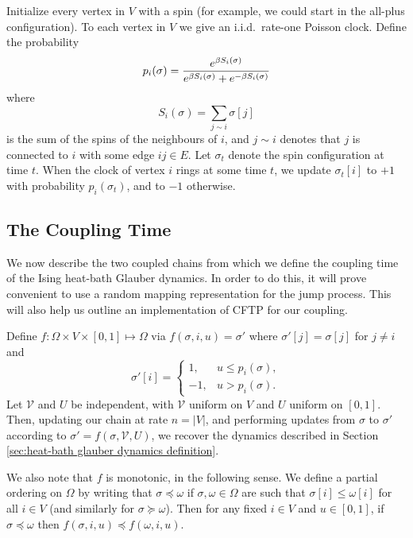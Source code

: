 	Initialize every vertex in $V$ with a spin (for example, we could start in the all-plus configuration). To each vertex in $V$ we give an i.i.d.\ rate-one Poisson clock. Define the probability 
	\begin{equation}
		p_i(\sigma) = \frac{e^{\beta S_i(\sigma)}}{e^{\beta S_i(\sigma)} + e^{-\beta S_i(\sigma)}}
		\label{eq:define p_i}
	\end{equation}
	where
	\begin{equation}
		S_i(\sigma) = \sum_{j \sim i} \sigma[j]
	\end{equation}
	is the sum of the spins of the neighbours of $i$, and $j \sim i$ denotes that $j$ is connected to $i$ with some edge $ij \in E$. Let $\sigma_t$ denote the spin configuration at time $t$. When the clock of vertex $i$ rings at some time $t$, we update $\sigma_t[i]$ to $+1$ with probability $p_i(\sigma_t)$, and to $-1$ otherwise.

	\subsection{The Coupling Time}
	\label{sec:the coupling time}
	We now describe the two coupled chains from which we define the coupling time of the Ising heat-bath Glauber dynamics. In order to do this, it will prove convenient to use a random mapping representation for the jump process. This will also help us outline an implementation of CFTP for our coupling.

	Define $f: \Omega \times V \times [0,1] \mapsto \Omega$ via $f(\sigma, i, u) = \sigma'$ where $\sigma'[j] = \sigma[j]$ for $j \neq i$ and
	\begin{equation}
		\sigma'[i] = 
			\begin{cases}
				1, &u \leq p_i(\sigma),\\
				-1, &u > p_i(\sigma).
			\end{cases}
		\label{eq:plusorminusrules}
	\end{equation}
	Let $\mathscr{V}$ and $U$ be independent, with $\mathscr{V}$ uniform on $V$ and $U$ uniform on $[0,1]$. Then, updating our chain at rate $n = |V|$, and performing updates from $\sigma$ to $\sigma'$ according to $\sigma' = f(\sigma, \mathscr{V}, U)$, we recover the dynamics described in Section \ref{sec:heat-bath glauber dynamics definition}.

	We also note that $f$ is monotonic, in the following sense. We define a partial ordering on $\Omega$ by writing that $\sigma \preceq \omega$ if $\sigma, \omega \in \Omega$ are such that $\sigma[i] \leq \omega[i]$ for all $i \in V$ (and similarly for $\sigma \succeq \omega$). Then for any fixed $i \in V$ and $u \in [0,1]$, if $\sigma \preceq \omega$ then $f(\sigma, i, u) \preceq f(\omega, i, u)$.
	
